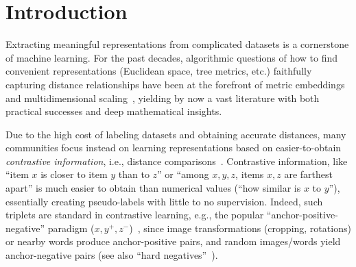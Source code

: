 \documentclass{article}
\theoremstyle{definition}  %
\theoremstyle{plain}
\numberwithin{observation}{section}
\numberwithin{claim}{section}
\numberwithin{fact}{section}
\numberwithin{lemma}{section}
\numberwithin{proposition}{section}
\numberwithin{theorem}{section}
\numberwithin{corollary}{section}
\numberwithin{definition}{section}
\theoremstyle{plain}
\begin{document}
\section{Introduction}


Extracting meaningful representations from complicated datasets is a cornerstone of machine learning. For the past decades, algorithmic questions of how to find convenient representations (Euclidean space, tree metrics, etc.) faithfully capturing distance relationships have been at the forefront of metric embeddings and multidimensional scaling~\citep{kruskal1964multidimensional,borg2007modern,indyk20178}, yielding by now a vast literature with both practical successes and deep mathematical insights.  

Due to the high cost of labeling datasets and obtaining accurate distances, many communities focus instead on learning representations based on easier-to-obtain \textit{contrastive information}, i.e., distance comparisons~\citep{agarwal2007generalized,tamuz2011adaptively,jamieson2011low,van2012stochastic,terada2014local,jain2016finite,kleindessner2017kernel}. Contrastive information, like ``item $x$ is closer to item $y$ than to $z$'' or ``among $x,y,z$, items $x,z$ are farthest apart'' %
is much easier to obtain than numerical values (``how similar is $x$ to $y$''), essentially creating pseudo-labels %
with little to no supervision. Indeed, such triplets are standard in contrastive learning, e.g., the popular ``anchor-positive-negative'' paradigm ($x,y^+,z^-$)~\citep{schroff2015facenet}, since image transformations (cropping, rotations) or nearby words produce anchor-positive pairs, and random images/words yield anchor-negative pairs (see also ``hard negatives''~\citep{robinson2020contrastive}). 
\end{document}
